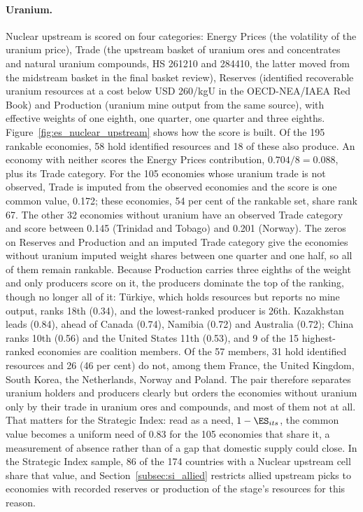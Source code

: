 \paragraph{Uranium.} Nuclear upstream is scored on four categories: Energy Prices (the
volatility of the uranium price), Trade (the upstream basket of uranium ores and concentrates and
natural uranium compounds, HS 261210 and 284410, the latter moved from the midstream basket in
the final basket review), Reserves (identified recoverable uranium resources at a cost below
USD 260/kgU in the OECD-NEA/IAEA Red Book) and Production (uranium mine output from the same
source), with effective weights of one eighth, one quarter, one quarter and three eighths.
Figure~\ref{fig:es_nuclear_upstream} shows how the score is built. Of the 195 rankable
economies, 58 hold identified resources and 18 of these also produce. An economy with neither
scores the Energy Prices contribution, $0.704/8=0.088$, plus its Trade category. For the 105
economies whose uranium trade is not observed, Trade is imputed from the observed economies and
the score is one common value, 0.172; these economies, 54 per cent of the rankable set, share
rank 67. The other 32 economies without uranium have an observed Trade category and score
between 0.145 (Trinidad and Tobago) and 0.201 (Norway). The zeros on Reserves and Production and
an imputed Trade category give the economies without uranium imputed weight shares between one
quarter and one half, so all of them remain rankable. Because Production carries three eighths
of the weight and only producers score on it, the producers dominate the top of the ranking,
though no longer all of it: T\"urkiye, which holds resources but reports no mine output, ranks
18th (0.34), and the lowest-ranked producer is 26th. Kazakhstan leads (0.84), ahead of Canada
(0.74), Namibia (0.72) and Australia (0.72); China ranks 10th (0.56) and the United States 11th
(0.53), and 9 of the 15 highest-ranked economies are coalition members. Of the 57 members, 31
hold identified resources and 26 (46 per cent) do not, among them France, the United Kingdom,
South Korea, the Netherlands, Norway and Poland. The pair therefore separates uranium holders and
producers clearly but orders the economies without uranium only by their trade in uranium ores
and compounds, and most of them not at all. That matters for the Strategic Index: read as a
need, $1-\ES_{its}$, the common value becomes a uniform need of 0.83 for the 105 economies that
share it, a measurement of absence rather than of a gap that domestic supply could close. In the
Strategic Index sample, 86 of the 174 countries with a Nuclear upstream cell share that value,
and Section~\ref{subsec:si_allied} restricts allied upstream picks to economies with recorded
reserves or production of the stage's resources for this reason.

